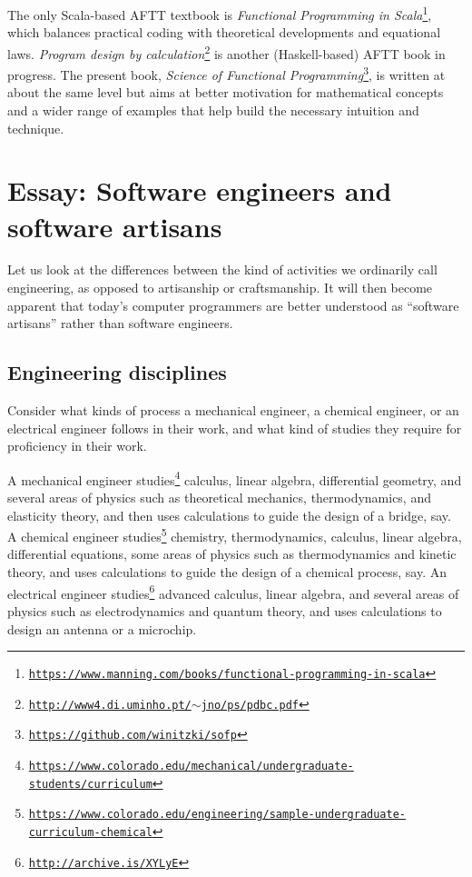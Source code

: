 The only Scala-based AFTT textbook is \emph{Functional Programming
in Scala}\footnote{\texttt{\href{https://www.manning.com/books/functional-programming-in-scala}{https://www.manning.com/books/functional-programming-in-scala}}},
which balances practical coding with theoretical developments and
equational laws. \emph{Program design by calculation}\footnote{\texttt{\href{http://www4.di.uminho.pt/~jno/ps/pdbc.pdf}{http://www4.di.uminho.pt/$\sim$jno/ps/pdbc.pdf}}}
is another (Haskell-based) AFTT book in progress. The present book,
\emph{Science of Functional Programming}\footnote{\texttt{\href{https://github.com/winitzki/sofp}{https://github.com/winitzki/sofp}}},
is written at about the same level but aims at better motivation for
mathematical concepts and a wider range of examples that help build
the necessary intuition and technique. 

\chapter{Essay: Software engineers and software artisans}

Let us look at the differences between the kind of activities we ordinarily
call engineering, as opposed to artisanship or craftsmanship. It will
then become apparent that today's computer programmers are better
understood as ``software artisans'' rather than software engineers.

\section{Engineering disciplines }

Consider what kinds of process a mechanical engineer, a chemical engineer,
or an electrical engineer follows in their work, and what kind of
studies they require for proficiency in their work.

A mechanical engineer studies\footnote{\texttt{\href{https://www.colorado.edu/mechanical/undergraduate-students/curriculum}{https://www.colorado.edu/mechanical/undergraduate-students/curriculum}}}
calculus, linear algebra, differential geometry, and several areas
of physics such as theoretical mechanics, thermodynamics, and elasticity
theory, and then uses calculations to guide the design of a bridge,
say. A chemical engineer studies\footnote{\texttt{\href{https://www.colorado.edu/engineering/sample-undergraduate-curriculum-chemical}{https://www.colorado.edu/engineering/sample-undergraduate-curriculum-chemical}}}
chemistry, thermodynamics, calculus, linear algebra, differential
equations, some areas of physics such as thermodynamics and kinetic
theory, and uses calculations to guide the design of a chemical process,
say. An electrical engineer studies\footnote{\texttt{\href{http://archive.is/XYLyE}{http://archive.is/XYLyE}}}
advanced calculus, linear algebra, and several areas of physics such
as electrodynamics and quantum theory, and uses calculations to design
an antenna or a microchip.

